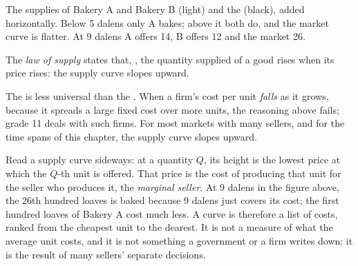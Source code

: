 \begin{omfigure}

{\small The supplies of Bakery A and Bakery B (light) and the  (black), added horizontally. Below 5 dalens only
A bakes; above it both do, and the market curve is flatter. At 9 dalens A offers 14, B offers 12 and the market 26.}
\end{omfigure}

\begin{definition}\label{def:g10:supply:law}
The \emph{law of supply} states that, , the quantity supplied of a good rises when its
price rises: the supply curve slopes upward.
\end{definition}

The  is less universal than the . When a firm's cost per unit \emph{falls} as it grows, because it
spreads a large fixed cost over more units, the reasoning above fails; grade 11 deals with such firms. For most markets with
many sellers, and for the time spans of this chapter, the supply curve slopes upward.

\begin{measure}
Read a supply curve sideways: at a quantity $Q$, its height is the lowest price at which the $Q$-th unit is offered. That price
is the cost of producing that unit for the seller who produces it, the \emph{marginal seller}. At 9 dalens in the figure above,
the 26th hundred loaves is baked because 9 dalens just covers its cost; the first hundred loaves of Bakery A cost much less. A
 curve is therefore a list of costs, ranked from the cheapest unit to the dearest. It is not a measure of what
the average unit costs, and it is not something a government or a firm writes down: it is the result of many sellers' separate
decisions.
\end{measure}

